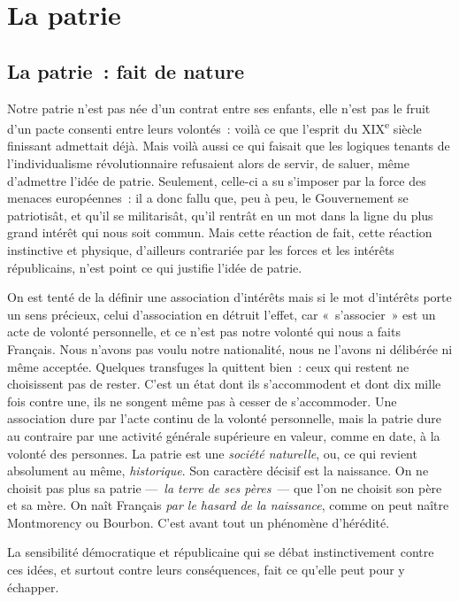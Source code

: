 \documentclass[french,twoside]{book} %
\newcommand{\astermono}{\medskip\centerline{\color{rubric}\large\selectfont{\syms ✻}}\medskip\par}%
\begin{document}
\section[La patrie]{La patrie}
\subsection[La patrie : fait de nature]{La patrie : fait de nature}
\noindent Notre patrie n’est pas née d’un contrat entre ses enfants, elle n’est pas le fruit d’un pacte consenti entre leurs volontés : voilà ce que l’esprit du XIX\textsuperscript{e} siècle finissant admettait déjà. Mais voilà aussi ce qui faisait que les logiques tenants de l’individualisme révolutionnaire refusaient alors de servir, de saluer, même d’admettre l’idée de patrie. Seulement, celle-ci a su s’imposer par la force des menaces européennes : il a donc fallu que, peu à peu, le Gouvernement se patriotisât, et qu’il se militarisât, qu’il rentrât en un mot dans la ligne du plus grand intérêt qui nous soit commun. Mais cette réaction de fait, cette réaction instinctive et physique, d’ailleurs contrariée par les forces et les intérêts républicains, n’est point ce qui justifie l’idée de patrie.\par

\astermono

\noindent On est tenté de la définir une association d’intérêts mais si le mot d’intérêts porte un sens précieux, celui d’association en détruit l’effet, car « s’associer » est un acte de volonté personnelle, et ce n’est pas notre volonté qui nous a faits Français. Nous n’avons pas voulu notre nationalité, nous ne l’avons ni délibérée ni même acceptée. Quelques transfuges la quittent bien : ceux qui restent ne choisissent pas de rester. C’est un état dont ils s’accommodent et dont dix mille fois contre une, ils ne songent même pas à cesser de s’accommoder. Une association dure par l’acte continu de la volonté personnelle, mais la patrie dure au contraire par une activité générale supérieure en valeur, comme en date, à la volonté des personnes. La patrie est une \emph{société naturelle}, ou, ce qui revient absolument au même, \emph{historique}. Son caractère décisif est la naissance. On ne choisit pas plus sa patrie — \emph{la terre de ses pères} — que l’on ne choisit son père et sa mère. On naît Français \emph{par le hasard de la naissance}, comme on peut naître Montmorency ou Bourbon. C’est avant tout un phénomène d’hérédité.\par
La sensibilité démocratique et républicaine qui se débat instinctivement contre ces idées, et surtout contre leurs conséquences, fait ce qu’elle peut pour y échapper.\par
\end{document}
